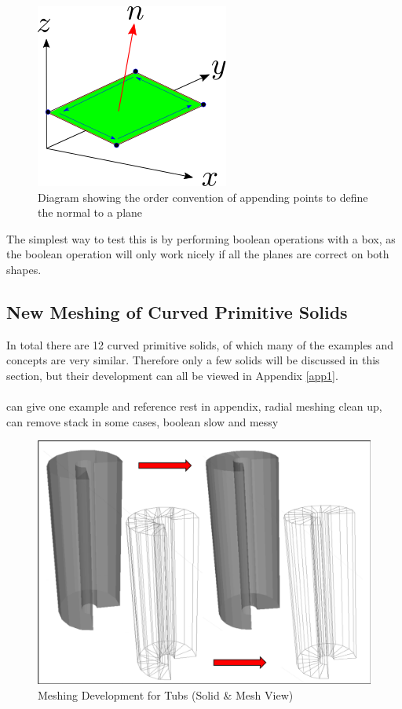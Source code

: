 \documentclass[12pt,a4paper]{article}
\begin{document}
\begin{figure}[h!]
\centering
\includegraphics[scale=0.75]{Images//append_points//Point_Appending_Order.png}
\caption[width=\columnwidth]{Diagram showing the order convention of appending points to define the normal to a plane}
\label{pointsorder}
\end{figure}
\noindent The simplest way to test this is by performing boolean operations with a box, as the boolean operation will only work nicely if all the planes are correct on both shapes.

\subsection{New Meshing of Curved Primitive Solids}
In total there are 12 curved primitive solids, of which many of the examples and concepts are very similar. Therefore only a few solids will be discussed in this section, but their development can all be viewed in Appendix \ref{app1}.
\\\\
can give one example and reference rest in appendix, radial meshing clean up, can remove stack in some cases, boolean slow and messy

\begin{figure}[h!]
\centering
\includegraphics[scale=0.5]{Images//Meshes//tubs.png}
\caption[width=\columnwidth]{Meshing Development for Tubs (Solid \& Mesh View)}
\label{tubspic}
\end{figure}
\end{document}
